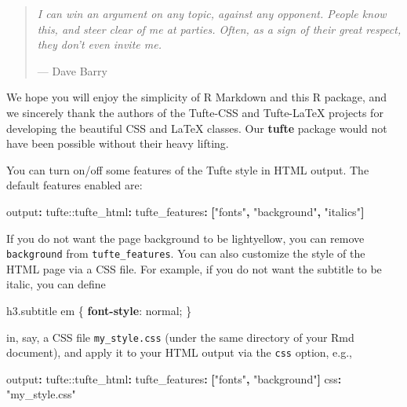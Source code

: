 \documentclass[a4paper,14pt]{tufte-handout}
\newenvironment{Shaded}{}{}
\newcommand{\AttributeTok}[1]{\textcolor[rgb]{0.49,0.56,0.16}{#1}}
\newcommand{\DecValTok}[1]{\textcolor[rgb]{0.25,0.63,0.44}{#1}}
\newcommand{\FunctionTok}[1]{\textcolor[rgb]{0.02,0.16,0.49}{#1}}
\newcommand{\KeywordTok}[1]{\textcolor[rgb]{0.00,0.44,0.13}{\textbf{#1}}}
\newcommand{\NormalTok}[1]{#1}
\newcommand{\OperatorTok}[1]{\textcolor[rgb]{0.40,0.40,0.40}{#1}}
\newcommand{\StringTok}[1]{\textcolor[rgb]{0.25,0.44,0.63}{#1}}
\begin{document}
\begin{quote}
\emph{I can win an argument on any topic, against any opponent. People
know this, and steer clear of me at parties. Often, as a sign of their
great respect, they don't even invite me.}

\hfill --- Dave Barry
\end{quote}

We hope you will enjoy the simplicity of R Markdown and this R package,
and we sincerely thank the authors of the Tufte-CSS and Tufte-LaTeX
projects for developing the beautiful CSS and LaTeX classes. Our
\textbf{tufte} package would not have been possible without their heavy
lifting.

You can turn on/off some features of the Tufte style in HTML output. The
default features enabled are:

\begin{Shaded}
\begin{Highlighting}[]
\FunctionTok{output}\KeywordTok{:}
\AttributeTok{  tufte:}\FunctionTok{:tufte\_html}\KeywordTok{:}
\AttributeTok{    }\FunctionTok{tufte\_features}\KeywordTok{:}\AttributeTok{ }\KeywordTok{[}\StringTok{"fonts"}\KeywordTok{,}\AttributeTok{ }\StringTok{"background"}\KeywordTok{,}\AttributeTok{ }\StringTok{"italics"}\KeywordTok{]}
\end{Highlighting}
\end{Shaded}

If you do not want the page background to be lightyellow, you can remove
\texttt{background} from \texttt{tufte\_features}. You can also
customize the style of the HTML page via a CSS file. For example, if you
do not want the subtitle to be italic, you can define

\begin{Shaded}
\begin{Highlighting}[]
\NormalTok{h3}\FunctionTok{.subtitle}\NormalTok{ em \{}
  \KeywordTok{font{-}style}\NormalTok{: }\DecValTok{normal}\OperatorTok{;}
\NormalTok{\}}
\end{Highlighting}
\end{Shaded}

in, say, a CSS file \texttt{my\_style.css} (under the same directory of
your Rmd document), and apply it to your HTML output via the
\texttt{css} option, e.g.,

\begin{Shaded}
\begin{Highlighting}[]
\FunctionTok{output}\KeywordTok{:}
\AttributeTok{  tufte:}\FunctionTok{:tufte\_html}\KeywordTok{:}
\AttributeTok{    }\FunctionTok{tufte\_features}\KeywordTok{:}\AttributeTok{ }\KeywordTok{[}\StringTok{"fonts"}\KeywordTok{,}\AttributeTok{ }\StringTok{"background"}\KeywordTok{]}
\AttributeTok{    }\FunctionTok{css}\KeywordTok{:}\AttributeTok{ }\StringTok{"my\_style.css"}
\end{Highlighting}
\end{Shaded}
\end{document}
